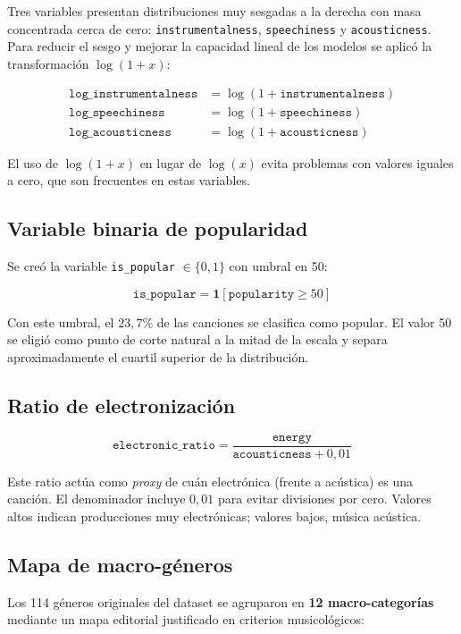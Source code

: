 \documentclass[12pt, a4paper, twoside]{book}
\theoremstyle{definition}
\begin{document}
Tres variables presentan distribuciones muy sesgadas a la derecha con masa
concentrada cerca de cero: \texttt{instrumentalness}, \texttt{speechiness} y
\texttt{acousticness}. Para reducir el sesgo y mejorar la capacidad lineal de
los modelos se aplicó la transformación $\log(1+x)$:

\begin{align}
\texttt{log\_instrumentalness} &= \log(1 + \texttt{instrumentalness}) \\
\texttt{log\_speechiness} &= \log(1 + \texttt{speechiness}) \\
\texttt{log\_acousticness} &= \log(1 + \texttt{acousticness})
\end{align}

El uso de $\log(1+x)$ en lugar de $\log(x)$ evita problemas con valores iguales
a cero, que son frecuentes en estas variables.

\subsection{Variable binaria de popularidad}

Se creó la variable \texttt{is\_popular} $\in \{0, 1\}$ con umbral en 50:

$$\texttt{is\_popular} = \mathbf{1}[\texttt{popularity} \geq 50]$$

Con este umbral, el $23{,}7\%$ de las canciones se clasifica como popular. El valor 50
se eligió como punto de corte natural a la mitad de la escala y separa
aproximadamente el cuartil superior de la distribución.

\subsection{Ratio de electronización}

$$\texttt{electronic\_ratio} = \frac{\texttt{energy}}{\texttt{acousticness} + 0{,}01}$$

Este ratio actúa como \textit{proxy} de cuán electrónica (frente a acústica) es
una canción. El denominador incluye $0{,}01$ para evitar divisiones por cero.
Valores altos indican producciones muy electrónicas; valores bajos, música acústica.

\subsection{Mapa de macro-géneros}

Los 114 géneros originales del dataset se agruparon en \textbf{12 macro-categorías}
mediante un mapa editorial justificado en criterios musicológicos:
\end{document}
